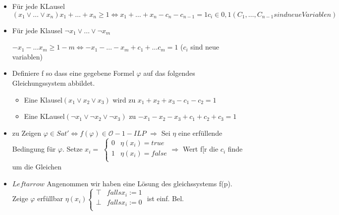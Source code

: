 \documentclass[12pt, oneside, a4paper, numbers=enddot, abstracton, parskip=full]{scrreprt}
\newcommand{\bigO}{\ensuremath{\mathcal{O}}}
\begin{document}
\begin{itemize}
\item Für jede KLausel
  \begin{math}
  (x_1 \vee \dots \vee x_n)
    x_1 + \dots + x_n \geq 1
    \Leftrightarrow
    x_1 + \dots + x_n - c_n - c_{n-1} = 1   c_i \in {0,1}
    (C_1, \dots , C_{n-1} sind neue Variablen)
   \end{math}
\item Für jede Klausel $\neg x_1 \vee \dots \vee \neg x_m$

  \begin{math}
    -x_1 - \dots x_m \geq 1 - m
    \Leftrightarrow -x_1 - \dots -x_m + c_1 + \dots c_m = 1
  \end{math} ($c_i$ sind neue variablen)

\item Definiere f so dass eine gegebene Formel $\varphi$ auf das folgendes
  Gleichungssystem abbildet.
  \begin{itemize}
  \item Eine Klausel$(x_1 \vee x_2 \vee x_3)$ wird zu
    $x_1 + x_2 + x_3 - c_1 - c_2 = 1$
  \item Eine KLausel$(\neg x_1 \vee \neg  x_2 \vee \neg x_3)$ zu
        $-x_1 -x_2 - x_3 + c_1 + c_2 + c_3= 1$
  \end{itemize}
\item zu Zeigen $\varphi \in Sat' \Leftrightarrow f(\varphi) \in \bigO -1 -ILP$
  $\Rightarrow$ Sei $\eta$ eine erfüllende Bedingung für $\varphi$.
  Setze $x_i =$
  \begin{math}
  \begin{cases}
    0 & \eta (x_i) = true \\
    1 & \eta (x_i) = false \\
  \end{cases}
  \Rightarrow
  \end{math}
  Wert f[r die $c_i$ finde um die Gleichen
  \item $Leftarrow$ Angenommen wir haben eine Lösung des gleichssystems f(p). Zeige $\varphi$
    erfüllbar
    \begin{math}
      \eta (x_i)
      \begin{cases}
        \top & falls x_i := 1 \\
        \bot & falls x_i := 0 \\
      \end{cases}
    \end{math}
      ist einf. Bel.
\end{itemize}
\end{document}
